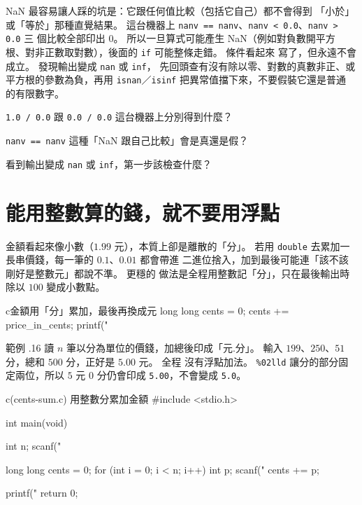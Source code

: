 NaN 最容易讓人踩的坑是：它跟任何值比較（包括它自己）都不會得到
「小於」或「等於」那種直覺結果。 這台機器上
\texttt{nanv == nanv}、\texttt{nanv < 0.0}、\texttt{nanv > 0.0} 三
個比較全部印出 $0$。 所以一旦算式可能產生 NaN（例如對負數開平方
根、對非正數取對數），後面的 \texttt{if} 可能整條走錯。 條件看起來
寫了，但永遠不會成立。 發現輸出變成 \texttt{nan} 或 \texttt{inf}，
先回頭查有沒有除以零、對數的真數非正、或平方根的參數為負，再用
\texttt{isnan}／\texttt{isinf} 把異常值擋下來，不要假裝它還是普通
的有限數字。


\begin{drills}[label=drills:float-inf-nan]
\item \texttt{1.0 / 0.0} 跟 \texttt{0.0 / 0.0} 這台機器上分別得到什麼？
\item \texttt{nanv == nanv} 這種「NaN 跟自己比較」會是真還是假？
\item 看到輸出變成 \texttt{nan} 或 \texttt{inf}，第一步該檢查什麼？
\end{drills}

\section{能用整數算的錢，就不要用浮點}
\label{sec:float-money-int}

金額看起來像小數（$1.99$ 元），本質上卻是離散的「分」。 若用
\texttt{double} 去累加一長串價錢，每一筆的 $0.1$、$0.01$ 都會帶進
二進位捨入，加到最後可能連「該不該剛好是整數元」都說不準。 更穩的
做法是全程用整數記「分」，只在最後輸出時除以 $100$ 變成小數點。

\begin{code}{c}{金額用「分」累加，最後再換成元}
long long cents = 0;
cents += price_in_cents;
printf("%
\end{code}

範例 \thechapter.16 讀 $n$ 筆以分為單位的價錢，加總後印成「元.分」。
輸入 $199$、$250$、$51$ 分，總和 $500$ 分，正好是 $5.00$ 元。 全程
沒有浮點加法。 \texttt{\%02lld} 讓分的部分固定兩位，所以 $5$ 元 $0$
分仍會印成 \texttt{5.00}，不會變成 \texttt{5.0}。

\begin{example}{c}{(cents-sum.c) 用整數分累加金額}
#include <stdio.h>

int main(void) {
    int n;
    scanf("%

    long long cents = 0;
    for (int i = 0; i < n; i++) {
        int p;
        scanf("%
        cents += p;
    }

    printf("%
    return 0;
}
\end{example}


